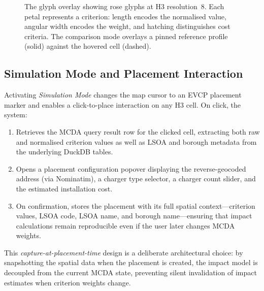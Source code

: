\begin{figure}[htbp]
    \centering
    \caption{The glyph overlay showing rose glyphs at H3 resolution~8. Each petal represents a criterion: length encodes the normalised value, angular width encodes the weight, and hatching distinguishes cost criteria. The comparison mode overlays a pinned reference profile (solid) against the hovered cell (dashed).}
    \label{fig:glyph-map}
\end{figure}

\subsection{Simulation Mode and Placement Interaction}
\label{sec:simulation-mode}

Activating \emph{Simulation Mode} changes the map cursor to an EVCP placement marker and enables a click-to-place interaction on any H3 cell. On click, the system:

\begin{enumerate}[nosep]
    \item Retrieves the MCDA query result row for the clicked cell, extracting both raw and normalised criterion values as well as LSOA and borough metadata from the underlying DuckDB tables.
    \item Opens a placement configuration popover displaying the reverse-geocoded address (via Nominatim), a charger type selector, a charger count slider, and the estimated installation cost.
    \item On confirmation, stores the placement with its full spatial context---criterion values, LSOA code, LSOA name, and borough name---ensuring that impact calculations remain reproducible even if the user later changes MCDA weights.
\end{enumerate}

\noindent This \emph{capture-at-placement-time} design is a deliberate architectural choice: by snapshotting the spatial data when the placement is created, the impact model is decoupled from the current MCDA state, preventing silent invalidation of impact estimates when criterion weights change.

